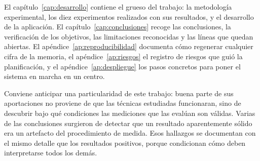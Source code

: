 El capítulo~\ref{cap:desarrollo} contiene el grueso del trabajo: la metodología
experimental, los diez experimentos realizados con sus resultados, y el desarrollo de la
aplicación. El capítulo~\ref{cap:conclusiones} recoge las conclusiones, la verificación de
los objetivos, las limitaciones reconocidas y las líneas que quedan abiertas. El
apéndice~\ref{ap:reproducibilidad} documenta cómo regenerar cualquier cifra de la memoria,
el apéndice~\ref{ap:riesgos} el registro de riesgos que guió la planificación, y el
apéndice~\ref{ap:despliegue} los pasos concretos para poner el sistema en marcha en un
centro.

Conviene anticipar una particularidad de este trabajo: buena parte de sus aportaciones no
proviene de que las técnicas estudiadas funcionaran, sino de descubrir bajo qué condiciones
las mediciones que las evalúan son válidas. Varias de las conclusiones surgieron de
detectar que un resultado aparentemente sólido era un artefacto del procedimiento de
medida. Esos hallazgos se documentan con el mismo detalle que los resultados positivos,
porque condicionan cómo deben interpretarse todos los demás.
